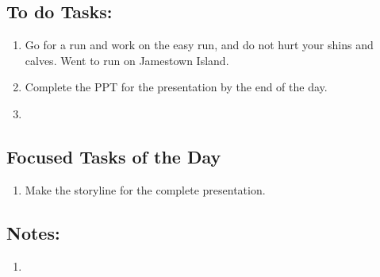\subsection*{To do Tasks:}
\begin{enumerate}
    \item Go for a run and work on the easy run, and do not hurt your shins and calves. Went to run on Jamestown Island. \cmark
    \item Complete the PPT for the presentation by the end of the day.
    \item 
\end{enumerate}
\subsection*{Focused Tasks of the Day}
\begin{enumerate}[\ding{212}]  %
    \item Make the storyline for the complete presentation. 
\end{enumerate}
\subsection*{Notes:}
\begin{enumerate}
    \item 
\end{enumerate}
\stardivider
